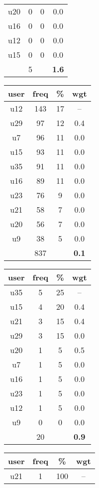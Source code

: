\begin{appendices}
\begin{table}
\begin{tabular}{ |c|c|c|c| }
	u20 & 0 & 0 & 0.0 \\
	u16 & 0 & 0 & 0.0 \\
	u12 & 0 & 0 & 0.0 \\
	u15 & 0 & 0 & 0.0 \\
	 & 5 & & \textbf{1.6} \\
	\hline
\end{tabular}
\begin{tabular}{ |c|c|c|c| }
	\hline
	\textbf{user} & \textbf{freq} & \textbf{\%} & \textbf{wgt} \\
	\hline
	u12 & 143 & 17 & -- \\
	u29 & 97 & 12 & 0.4 \\
	u7 & 96 & 11 & 0.0 \\
	u15 & 93 & 11 & 0.0 \\
	u35 & 91 & 11 & 0.0 \\
	u16 & 89 & 11 & 0.0 \\
	u23 & 76 & 9 & 0.0 \\
	u21 & 58 & 7 & 0.0 \\
	u20 & 56 & 7 & 0.0 \\
	u9 & 38 & 5 & 0.0 \\
	 & 837 & & \textbf{0.1} \\
	\hline
\end{tabular}
\begin{tabular}{ |c|c|c|c| }
	\hline
	\textbf{user} & \textbf{freq} & \textbf{\%} & \textbf{wgt} \\
	\hline
	u35 & 5 & 25 & -- \\
	u15 & 4 & 20 & 0.4 \\
	u21 & 3 & 15 & 0.4 \\
	u29 & 3 & 15 & 0.0 \\
	u20 & 1 & 5 & 0.5 \\
	u7 & 1 & 5 & 0.0 \\
	u16 & 1 & 5 & 0.0 \\
	u23 & 1 & 5 & 0.0 \\
	u12 & 1 & 5 & 0.0 \\
	u9 & 0 & 0 & 0.0 \\
	 & 20 & & \textbf{0.9} \\
	\hline
\end{tabular}
\begin{tabular}{ |c|c|c|c| }
	\hline
	\textbf{user} & \textbf{freq} & \textbf{\%} & \textbf{wgt} \\
	\hline
	u21 & 1 & 100 & -- \\

\end{tabular}
\end{table}
\end{appendices}
